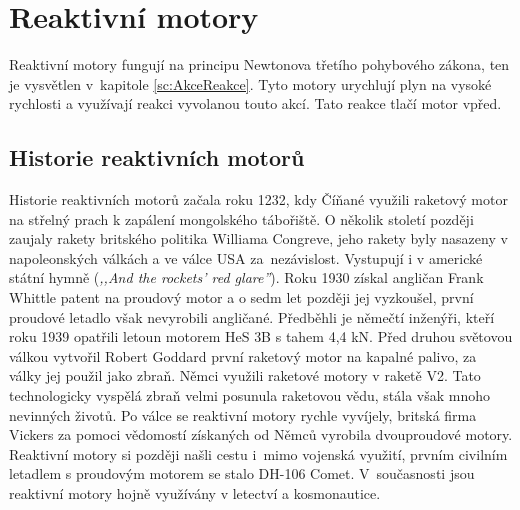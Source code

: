 \section{Reaktivní motory}
{Reaktivní motory fungují na principu Newtonova třetího pohybového zákona, ten je vysvětlen v~kapitole \ref{sc:AkceReakce}. Tyto motory urychlují plyn na vysoké rychlosti a využívají reakci vyvolanou touto akcí. Tato reakce tlačí motor vpřed.}

\subsection{Historie reaktivních motorů}
{Historie reaktivních motorů začala roku 1232, kdy Číňané využili raketový motor na střelný prach k zapálení mongolského tábořiště. O několik století později zaujaly rakety britského politika Williama Congreve, jeho rakety byly nasazeny v napoleonských válkách a ve válce USA za~nezávislost. Vystupují i v americké státní hymně (\textit{,,And the rockets' red glare''}).}
\cite{VUTB:NavrhRaketovehoMotoru}\odst
{Roku 1930 získal angličan Frank Whittle patent na proudový motor a o sedm let později jej vyzkoušel, první proudové letadlo však nevyrobili angličané. Předběhli je němečtí inženýři, kteří roku 1939 opatřili letoun motorem HeS 3B s tahem 4,4 kN.}
\cite{VUTB:PrehledTechnickychAspektuVyvojeLeteckychProudovychMotoru}\odst
{Před druhou světovou válkou vytvořil Robert Goddard první raketový motor na kapalné palivo, za války jej použil jako zbraň. Němci využili raketové motory v raketě V2. Tato technologicky vyspělá zbraň velmi posunula raketovou vědu, stála však mnoho nevinných životů.}
\cite{VUTB:NavrhRaketovehoMotoru}\odst
{Po válce se reaktivní motory rychle vyvíjely, britská firma Vickers za pomoci vědomostí získaných od Němců vyrobila dvouproudové motory. Reaktivní motory si později našli cestu i~mimo vojenská využití, prvním civilním letadlem s proudovým motorem se stalo DH-106 Comet. V~současnosti jsou reaktivní motory hojně využívány v letectví a kosmonautice.}
\cite{VUTB:PrehledTechnickychAspektuVyvojeLeteckychProudovychMotoru}

